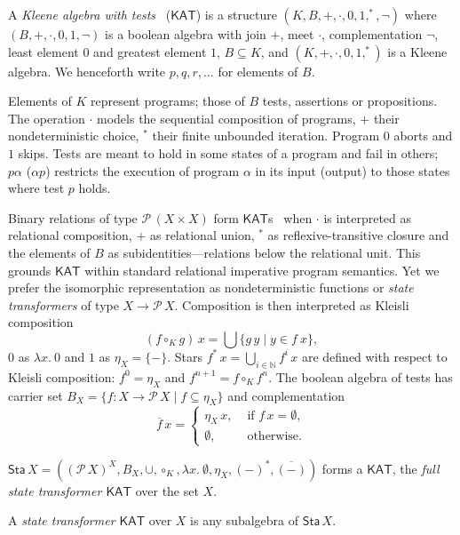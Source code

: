 \documentclass[envcountsames]{llncs}
\newcommand{\KAT}{\mathsf{KAT}}
\newcommand{\Pow}{\mathcal{P}}
\newcommand{\sta}{\mathsf{Sta}}
\begin{document}
A \emph{Kleene algebra with tests}~\cite{Kozen97} ($\KAT$) is a structure
$(K,B,+,\cdot,0,1,^\ast,\neg)$ where $(B,+,\cdot,0,1,\neg)$ is a
boolean algebra with join $+$, meet $\cdot$, complementation $\neg$,
least element $0$ and greatest element $1$, $B\subseteq K$, and
$(K,+,\cdot,0,1,^\ast)$ is a Kleene algebra. We henceforth write
$p,q,r,\dots$ for elements of $B$. 

Elements of $K$ represent programs; those of $B$ tests, assertions or
propositions.  The operation $\cdot$ models the sequential composition
of programs, $+$ their nondeterministic choice, $^\ast$ their finite
unbounded iteration. Program $0$ aborts and $1$ skips.  Tests are
meant to hold in some states of a program and fail in others;
$p\alpha$ ($\alpha p$) restricts the execution of program $\alpha$ in
its input (output) to those states where test $p$ holds.

Binary relations of type $\Pow\, (X\times X)$ form
$\KAT$s~\cite{Kozen97} when $\cdot$ is interpreted as relational
composition, $+$ as relational union, $^\ast$ as reflexive-transitive
closure and the elements of $B$ as subidentities---relations below the
relational unit. This grounds $\KAT$ within standard relational
imperative program semantics. Yet we prefer the isomorphic
representation as nondeterministic functions or \emph{state
  transformers} of type $X\to \Pow\, X$.  Composition is then
interpreted as Kleisli composition
\begin{equation*} 
(f\circ_K g)\, x = \bigcup\{g\, y\mid y \in f\ x \}, 
\end{equation*} 
$0$ as $\lambda x.\ 0$ and $1$ as $\eta_X = \{-\}$.  Stars
$f^{\ast}\, x = \bigcup_{i\in\mathbb{N}} f^i\, x$ are defined with
  respect to Kleisli composition: $f^{0} = \eta_X$ and
  $f^{n+1} = f \circ_K f^{n}$. The boolean algebra of tests has
  carrier set $B_X=\{f:X\to \Pow\, X \mid f\subseteq \eta_X\}$ and complementation
  \begin{equation*} 
    \overline{f}\, x =
  \begin{cases}
    \eta_X\, x, & \text{ if } f\, x = \emptyset,\\
\emptyset, & \text{ otherwise}.
  \end{cases}
\end{equation*}

\begin{proposition}\label{P:kleisli-ka}
$\sta\, X = ((\Pow\, X)^X,B_X,\cup,\circ_K,\lambda x.\
  \emptyset, \eta_X,(-)^{\ast},\overline{(-)})$
  forms a $\KAT$, the \emph{full state transformer $\KAT$} over the
  set $X$.
\end{proposition}
A \emph{state transformer $\KAT$} over $X$ is any subalgebra of
$\sta\, X$. 
\end{document}
